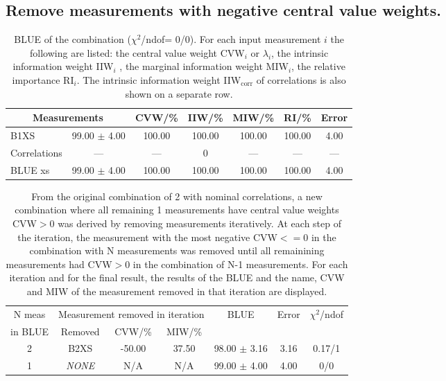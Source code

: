 \subsection{Remove measurements with negative central value weights.}
\begin{table}[H]
\scriptsize
\begin{center}
\renewcommand{\arraystretch}{1.1}
\begin{tabular}{|lc|c|c|c|c|c|}
\hline
\multicolumn{2}{|c|}{Measurements} & CVW/\%  & IIW/\%  & MIW/\%  & RI/\%  & {\tiny Error}\\
\hline
B1XS &      99.00 $\pm$       4.00 &     100.00 &     100.00 &     100.00 &     100.00 &       4.00\\
Correlations & --- & --- &  0 & --- & --- & ---\\
\hline
BLUE {\tiny xs} &      99.00 $\pm$       4.00 &     100.00 &     100.00 &     100.00 &     100.00 &       4.00\\
\hline
\end{tabular}
\caption{BLUE of the combination ($\chi^2$/ndof= 0/0).
 For each input measurement $i$ the following are listed: the central value weight CVW$_i$ or $\lambda_i$, the intrinsic information weight IIW$_i$ , the marginal information weight MIW$_i$, the relative importance RI$_i$. The intrinsic information weight IIW$_{\mathrm{corr}}$ of correlations is also shown on a separate row.}
\renewcommand{\arraystretch}{1}
\end{center}
\end{table}
\begin{table}[H]
\scriptsize
\begin{center}
\renewcommand{\arraystretch}{1.2}
\begin{tabular}{|c|c|c|c|c|c|c|}
\hline
N {\tiny meas} & \multicolumn{3}{c|}{Measurement removed in iteration} & \multirow{2}{*}{BLUE} & \multirow{2}{*}{\tiny Error} & \multirow{2}{*}{\tiny$\chi^2$/ndof}\\
\cline{2-4}
{\tiny in BLUE} & Removed & CVW/\% & MIW/\% & & & \\\hline
2 & B2XS &     -50.00 &      37.50 &      98.00 $\pm$      3.16 &       3.16 &       0.17/1 \\
\hline
1 & {\em NONE} & N/A & N/A & 
     99.00 $\pm$      4.00 &       4.00 &  0/0 \\
\hline
\end{tabular}
\caption{From the original combination of 2 with nominal correlations, a new combination where all remaining 1 measurements have central value weights CVW$>$0 was derived by removing measurements iteratively. At each step of the iteration, the measurement with the most negative CVW$<=$0 in the combination with N measurements was removed until all remainining measurements had CVW$>$0 in the combination of N-1 measurements. For each iteration and for the final result, the results of the BLUE and the name, CVW and MIW of the measurement removed in that iteration are displayed.}
\renewcommand{\arraystretch}{1}
\end{center}
\end{table}
